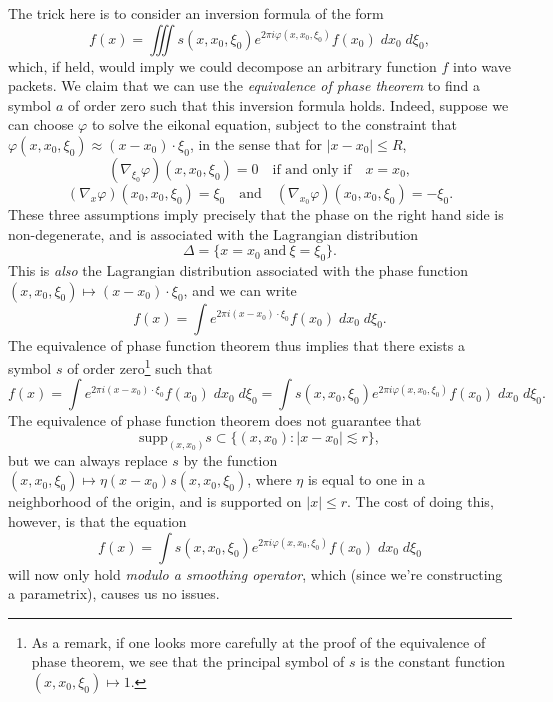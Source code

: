 \documentclass{article}
\theoremstyle{plain}
\theoremstyle{remark}
\theoremstyle{definition}
\begin{document}
The trick here is to consider an inversion formula of the form
%
\[ f(x) = \iiint s(x,x_0,\xi_0) e^{2 \pi i \varphi(x,x_0,\xi_0)} f(x_0)\; dx_0\; d\xi_0, \]
%
which, if held, would imply we could decompose an arbitrary function $f$ into wave packets. We claim that we can use the \emph{equivalence of phase theorem} to find a symbol $a$ of order zero such that this inversion formula holds. Indeed, suppose we can choose $\varphi$ to solve the eikonal equation, subject to the constraint that $\varphi(x,x_0,\xi_0) \approx (x - x_0) \cdot \xi_0$, in the sense that for $|x - x_0| \leq R$,
%
\[ (\nabla_{\xi_0} \varphi)(x,x_0,\xi_0) = 0 \quad\text{if and only if}\quad x = x_0, \]
%
\[ (\nabla_x \varphi)(x_0,x_0,\xi_0) = \xi_0 \quad\text{and}\quad (\nabla_{x_0} \varphi)(x_0,x_0,\xi_0) = - \xi_0. \]
%
These three assumptions imply precisely that the phase on the right hand side is non-degenerate, and is associated with the Lagrangian distribution
%
\[ \Delta = \Big\{ x = x_0\ \text{and}\ \xi = \xi_0 \Big\}. \]
%
This is \emph{also} the Lagrangian distribution associated with the phase function $(x,x_0,\xi_0) \mapsto (x - x_0) \cdot \xi_0$, and we can write
%
\[ f(x) = \int e^{2 \pi i (x - x_0) \cdot \xi_0} f(x_0)\; dx_0\; d\xi_0. \]
%
The equivalence of phase function theorem thus implies that there exists a symbol $s$ of order zero\footnote{As a remark, if one looks more carefully at the proof of the equivalence of phase theorem, we see that the principal symbol of $s$ is the constant function $(x,x_0,\xi_0) \mapsto 1$.} such that
%
\[ f(x) = \int e^{2 \pi i (x - x_0) \cdot \xi_0} f(x_0)\; dx_0\; d\xi_0 = \int s(x,x_0,\xi_0) e^{2 \pi i \varphi(x,x_0,\xi_0)} f(x_0)\; dx_0\; d\xi_0. \]
%
The equivalence of phase function theorem does not guarantee that
%
\[ \text{supp}_{(x,x_0)} s \subset \{ (x,x_0) : |x - x_0| \lesssim r \}, \]
%
but we can always replace $s$ by the function $(x,x_0,\xi_0) \mapsto \eta(x - x_0) s(x,x_0,\xi_0)$, where $\eta$ is equal to one in a neighborhood of the origin, and is supported on $|x| \leq r$. The cost of doing this, however, is that the equation
%
\[ f(x) = \int s(x,x_0,\xi_0) e^{2 \pi i \varphi(x,x_0,\xi_0)} f(x_0)\; dx_0\; d\xi_0 \]
%
will now only hold \emph{modulo a smoothing operator}, which (since we're constructing a parametrix), causes us no issues.
\end{document}
